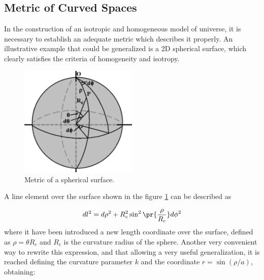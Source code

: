 	\subsection{Metric of Curved Spaces}
	\label{subsec:MetricOFCurvedSpaces}

	
In the construction of an isotropic and homogeneous model of universe, it 
is necessary to establish an adequate metric which describes it properly. 
An illustrative example that could be generalized is a 2D spherical 
surface, which clearly satisfies the criteria of homogeneity and isotropy.



\begin{figure}[htbp]
	\centering
	\includegraphics[width=0.5\textwidth]
	{./figures/2_theoretical_framework/2D_Sphere.png}
	
	\caption{\small{Metric of a spherical surface.}}
	
	\label{fig:2sphere}
\end{figure}


A line element over the surface shown in the figure \ref{fig:2sphere} can
be described as


\[ dl^2 = d\rho^2 + R_c^2 \sin^2 \pr{ \frac{\rho}{R_c}}d\phi^2 \]
where it have been introduced a new length coordinate over the surface, 
defined as $\rho = \theta R_c$ and $R_c$ is the curvature radius of the 
sphere. Another very convenient way to rewrite this expression, and that 
allowing a very useful generalization, it is reached defining the curvature
parameter $k$ and the coordinate $r = \sin (\rho/a)$, obtaining:


